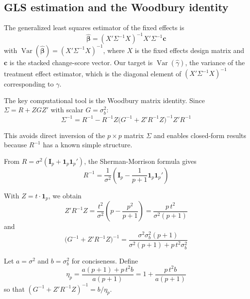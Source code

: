 \documentclass[
]{article}
\begin{document}
\subsection{GLS estimation and the Woodbury
identity}\label{gls-estimation-and-the-woodbury-identity}

The generalized least squares estimator of the fixed effects is
\begin{equation}
  \hat{\boldsymbol{\beta}} = (X' \Sigma^{-1} X)^{-1} X' \Sigma^{-1}
  \mathbf{c}
  \label{eq:gls}
\end{equation} with
\(\mathop{\mathrm{Var}}(\hat{\boldsymbol{\beta}}) = (X' \Sigma^{-1} X)^{-1}\),
where \(X\) is the fixed effects design matrix and \(\mathbf{c}\) is the
stacked change-score vector. Our target is
\(\mathop{\mathrm{Var}}(\hat{\gamma})\), the variance of the treatment
effect estimator, which is the diagonal element of
\((X' \Sigma^{-1} X)^{-1}\) corresponding to \(\gamma\).

The key computational tool is the Woodbury matrix identity. Since
\(\Sigma = R + Z G Z'\) with scalar \(G = \sigma_b^2\): \begin{equation}
  \Sigma^{-1} = R^{-1} - R^{-1} Z
    \bigl(G^{-1} + Z' R^{-1} Z\bigr)^{-1}
    Z' R^{-1}
  \label{eq:woodbury}
\end{equation}

This avoids direct inversion of the \(p \times p\) matrix \(\Sigma\) and
enables closed-form results because \(R^{-1}\) has a known simple
structure.

From \(R = \sigma^2(\mathbf{I}_p + \mathbf{1}_p
\mathbf{1}_p')\), the Sherman-Morrison formula gives \begin{equation}
  R^{-1} = \frac{1}{\sigma^2}\left(
    \mathbf{I}_p - \frac{1}{p+1}
    \mathbf{1}_p \mathbf{1}_p'
  \right)
  \label{eq:Rinv}
\end{equation}

With \(Z = t \cdot \mathbf{1}_p\), we obtain \begin{equation}
  Z' R^{-1} Z = \frac{t^2}{\sigma^2}
    \left(p - \frac{p^2}{p+1}\right)
  = \frac{p\, t^2}{\sigma^2(p+1)}
  \label{eq:ZRZ}
\end{equation} and \begin{equation}
  \bigl(G^{-1} + Z' R^{-1} Z\bigr)^{-1}
  = \frac{\sigma^2 \sigma_b^2 (p+1)}
    {\sigma^2(p+1) + p\, t^2 \sigma_b^2}
  \label{eq:H}
\end{equation}

Let \(a = \sigma^2\) and \(b = \sigma_b^2\) for conciseness. Define
\begin{equation}
  \eta_p = \frac{a(p+1) + p\, t^2 b}{a(p+1)}
  = 1 + \frac{p\, t^2 b}{a(p+1)}
  \label{eq:eta}
\end{equation} so that \((G^{-1} + Z'R^{-1}Z)^{-1} = b / \eta_p\).
\end{document}
